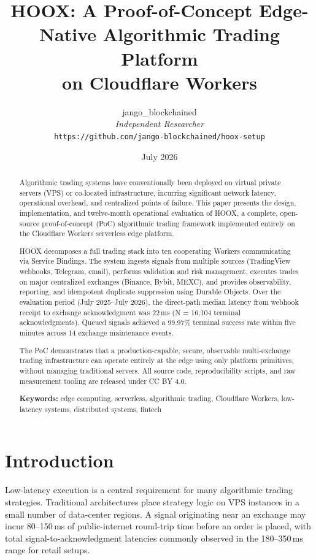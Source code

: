 \documentclass[10pt,a4paper]{article}
\title{\textbf{HOOX: A Proof-of-Concept Edge-Native Algorithmic Trading Platform\\on Cloudflare Workers}}
\author{
  jango\_blockchained\\
  \textit{Independent Researcher}\\
  \texttt{https://github.com/jango-blockchained/hoox-setup}
}
\date{July 2026}
\newcommand{\textsc}[1]{\textsf{\small #1}}
\begin{document}
\maketitle

\begin{abstract}
Algorithmic trading systems have conventionally been deployed on virtual private servers (VPS) or co-located infrastructure, incurring significant network latency, operational overhead, and centralized points of failure. This paper presents the design, implementation, and twelve-month operational evaluation of \textsc{HOOX}, a complete, open-source proof-of-concept (PoC) algorithmic trading framework implemented entirely on the Cloudflare Workers serverless edge platform.

\textsc{HOOX} decomposes a full trading stack into ten cooperating Workers communicating via Service Bindings. The system ingests signals from multiple sources (TradingView webhooks, Telegram, email), performs validation and risk management, executes trades on major centralized exchanges (Binance, Bybit, MEXC), and provides observability, reporting, and idempotent duplicate suppression using Durable Objects. Over the evaluation period (July 2025--July 2026), the direct-path median latency from webhook receipt to exchange acknowledgment was 22\,ms (N = 16{,}104 terminal acknowledgments). Queued signals achieved a 99.97\% terminal success rate within five minutes across 14 exchange maintenance events.

The PoC demonstrates that a production-capable, secure, observable multi-exchange trading infrastructure can operate entirely at the edge using only platform primitives, without managing traditional servers. All source code, reproducibility scripts, and raw measurement tooling are released under CC BY 4.0.

\textbf{Keywords:} edge computing, serverless, algorithmic trading, Cloudflare Workers, low-latency systems, distributed systems, fintech
\end{abstract}

\section{Introduction}
\label{sec:intro}

Low-latency execution is a central requirement for many algorithmic trading strategies. Traditional architectures place strategy logic on VPS instances in a small number of data-center regions. A signal originating near an exchange may incur 80--150\,ms of public-internet round-trip time before an order is placed, with total signal-to-acknowledgment latencies commonly observed in the 180--350\,ms range for retail setups.
\end{document}
